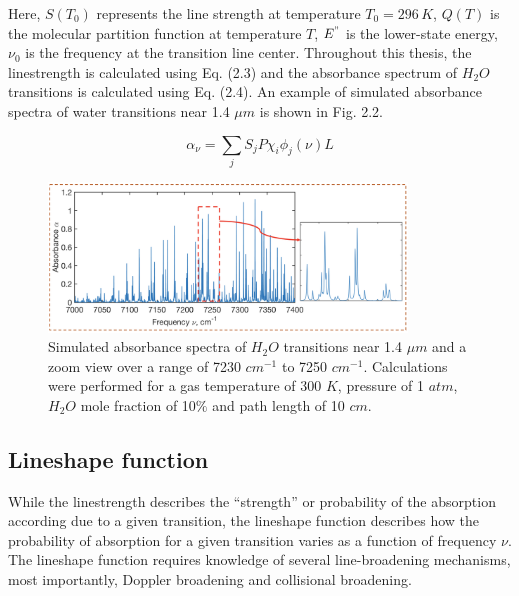 \vspace{4mm}

\noindent Here, $S(T_0)$ represents the line strength at temperature $T_0 = 296 \,K$, $Q(T)$ is the molecular partition function at temperature $T$, $E^"$ is the lower-state energy, $\nu_0$ is the frequency at the transition line center. Throughout this thesis, the linestrength is calculated using Eq. (2.3) and the absorbance spectrum of $H_2O$ transitions is calculated using Eq. (2.4). An example of simulated absorbance spectra of water transitions near 1.4 $\mu m$ is shown in Fig. 2.2.

\begin{equation}\label{}
\alpha_\nu=\sum_jS_jP\chi_i\phi_j(\nu)L
\end{equation}

\begin{figure}[ht]
    \centering
        \includegraphics[width=0.85\textwidth]{fig/ch2_fig3.png}
        \caption{Simulated absorbance spectra of $H_2O$ transitions near 1.4 $\mu m$ and a zoom view over a range of 7230 $cm^{-1}$ to 7250 $cm^{-1}$. Calculations were performed for a gas temperature of 300 $K$, pressure of 1 $atm$, $H_2O$ mole fraction of 10$\%$ and path length of 10 $cm$.}
    \label{fig:ch2_2}
\end{figure}

\vspace{50mm}


\subsection{Lineshape function}
While the linestrength describes the ``strength'' or probability of the absorption according due to a given transition, the lineshape function describes how the probability of absorption for a given transition varies as a function of frequency $\nu$. The lineshape function requires knowledge of several line-broadening mechanisms, most importantly, Doppler broadening and collisional broadening.

